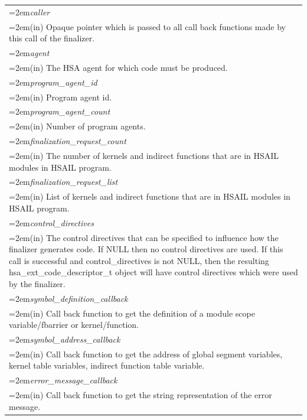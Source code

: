 \documentclass[final]{book}
\newcommand{\hsaarg}[1]{\textit{#1}}
\begin{document}
\noindent\begin{longtable}{@{}>{\hangindent=2em}p{\textwidth}}
\hsaarg{caller}\\\hspace{2em}(in) Opaque pointer which is passed to all call back functions made by this call of the finalizer.\\[2mm]
\hsaarg{agent}\\\hspace{2em}(in) The HSA agent for which code must be produced.\\[2mm]
\hsaarg{program_\-agent_\-id}\\\hspace{2em}(in) Program agent id.\\[2mm]
\hsaarg{program_\-agent_\-count}\\\hspace{2em}(in) Number of program agents.\\[2mm]
\hsaarg{finalization_\-request_\-count}\\\hspace{2em}(in) The number of kernels and indirect functions that are in HSAIL modules in HSAIL program.\\[2mm]
\hsaarg{finalization_\-request_\-list}\\\hspace{2em}(in) List of kernels and indirect functions that are in HSAIL modules in HSAIL program.\\[2mm]
\hsaarg{control_\-directives}\\\hspace{2em}(in) The control directives that can be specified to influence how the finalizer generates code. If NULL then no control directives are used. If this call is successful and control_\-directives is not NULL, then the resulting hsa_\-ext_\-code_\-descriptor_\-t object will have control directives which were used by the finalizer.\\[2mm]
\hsaarg{symbol_\-definition_\-callback}\\\hspace{2em}(in) Call back function to get the definition of a module scope variable/fbarrier or kernel/function.\\[2mm]
\hsaarg{symbol_\-address_\-callback}\\\hspace{2em}(in) Call back function to get the address of global segment variables, kernel table variables, indirect function table variable.\\[2mm]
\hsaarg{error_\-message_\-callback}\\\hspace{2em}(in) Call back function to get the string representation of the error message.\\[2mm]

\end{longtable}
\end{document}
